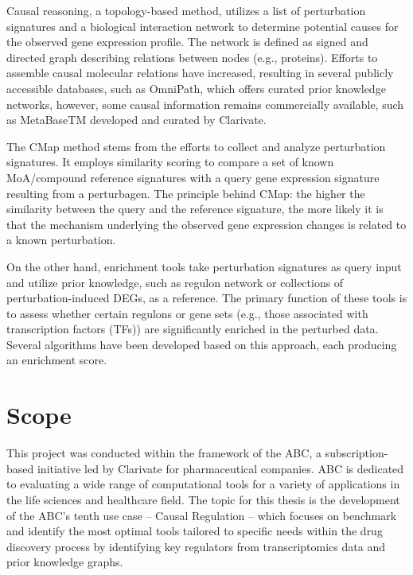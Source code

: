 Causal reasoning, a topology-based method, utilizes a list of perturbation signatures and a biological interaction network to determine potential causes for the observed gene expression profile. The network is defined as signed and directed graph describing relations between nodes (e.g., proteins). Efforts to assemble causal molecular relations have increased, resulting in several publicly accessible databases, such as OmniPath, which offers curated prior knowledge networks, however, some causal information remains commercially available, such as MetaBaseTM developed and curated by Clarivate.

The \gls{CMap} method stems from the efforts to collect and analyze perturbation signatures. It employs similarity scoring to compare a set of known MoA/compound reference signatures with a query gene expression signature resulting from a perturbagen. The principle behind CMap: the higher the similarity between the query and the reference signature, the more likely it is that the mechanism underlying the observed gene expression changes is related to a known perturbation.

On the other hand, enrichment tools take perturbation signatures as query input and utilize prior knowledge, such as regulon network or collections of perturbation-induced \gls{DEGs}, as a reference. The primary function of these tools is to assess whether certain regulons or gene sets (e.g., those associated with transcription factors (TFs)) are significantly enriched in the perturbed data. Several algorithms have been developed based on this approach, each producing an enrichment score.


\section{Scope} %
\label{sec:scope}
This project was conducted within the framework of the \gls{ABC}, a subscription-based initiative led by Clarivate for pharmaceutical companies. \gls{ABC} is dedicated to evaluating a wide range of computational tools for a variety of applications in the life sciences and healthcare field. The topic for this thesis is the development of the ABC’s tenth use case – Causal Regulation – which focuses on benchmark and identify the most optimal tools tailored to specific needs within the drug discovery process by identifying key regulators from transcriptomics data and prior knowledge graphs.

